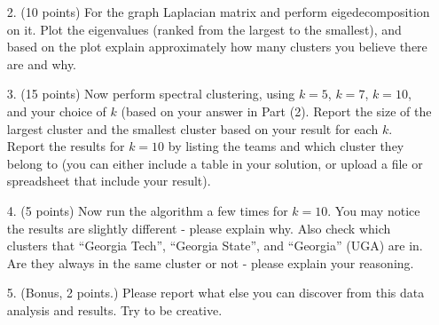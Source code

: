 \documentclass[twoside,10pt]{article}
\begin{document}
\begin{enumerate}
\item[2.] (10 points) For the graph Laplacian matrix and perform eigedecomposition on it. Plot the eigenvalues (ranked from the largest to the smallest), and based on the plot explain approximately how many clusters you believe there are and why.

\item[3.] (15 points) Now perform spectral clustering, using $k = 5$, $k = 7$, $k=10$, and your choice of $k$ (based on your answer in Part (2). Report the size of the largest cluster and the smallest cluster based on your result for each $k$. Report the results for $k=10$ by listing the teams and which cluster they belong to (you can either include a table in your solution, or upload a file or spreadsheet that include your result).  

\item[4.] (5 points) Now run the algorithm a few times for $k=10$. You may notice the results are slightly different - please explain why. Also check which clusters that ``Georgia Tech'', ``Georgia State'', and ``Georgia'' (UGA) are in. Are they always in the same cluster or not - please explain your reasoning. 

\item[5.] (Bonus, 2 points.) Please report what else you can discover from this data analysis and results. Try to be creative.

\end{enumerate}
\end{document}
